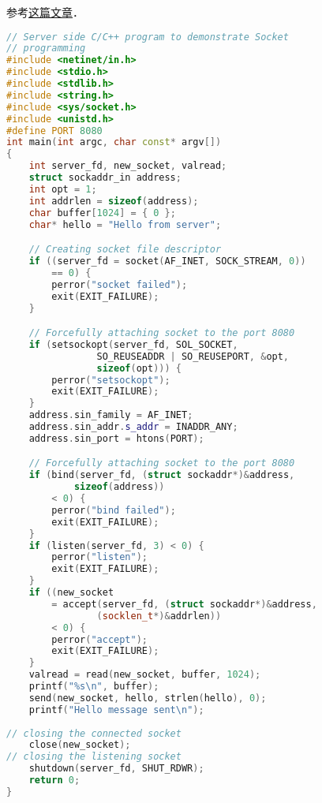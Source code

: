 
\begin{issues}
\issueDraft
\end{issues}

参考\href{https://www.geeksforgeeks.org/socket-programming-cc/}{这篇文章}．

\begin{lstlisting}[language=cpp, caption=server.cpp]
// Server side C/C++ program to demonstrate Socket
// programming
#include <netinet/in.h>
#include <stdio.h>
#include <stdlib.h>
#include <string.h>
#include <sys/socket.h>
#include <unistd.h>
#define PORT 8080
int main(int argc, char const* argv[])
{
	int server_fd, new_socket, valread;
	struct sockaddr_in address;
	int opt = 1;
	int addrlen = sizeof(address);
	char buffer[1024] = { 0 };
	char* hello = "Hello from server";

	// Creating socket file descriptor
	if ((server_fd = socket(AF_INET, SOCK_STREAM, 0))
		== 0) {
		perror("socket failed");
		exit(EXIT_FAILURE);
	}

	// Forcefully attaching socket to the port 8080
	if (setsockopt(server_fd, SOL_SOCKET,
				SO_REUSEADDR | SO_REUSEPORT, &opt,
				sizeof(opt))) {
		perror("setsockopt");
		exit(EXIT_FAILURE);
	}
	address.sin_family = AF_INET;
	address.sin_addr.s_addr = INADDR_ANY;
	address.sin_port = htons(PORT);

	// Forcefully attaching socket to the port 8080
	if (bind(server_fd, (struct sockaddr*)&address,
			sizeof(address))
		< 0) {
		perror("bind failed");
		exit(EXIT_FAILURE);
	}
	if (listen(server_fd, 3) < 0) {
		perror("listen");
		exit(EXIT_FAILURE);
	}
	if ((new_socket
		= accept(server_fd, (struct sockaddr*)&address,
				(socklen_t*)&addrlen))
		< 0) {
		perror("accept");
		exit(EXIT_FAILURE);
	}
	valread = read(new_socket, buffer, 1024);
	printf("%s\n", buffer);
	send(new_socket, hello, strlen(hello), 0);
	printf("Hello message sent\n");
	
// closing the connected socket
	close(new_socket);
// closing the listening socket
	shutdown(server_fd, SHUT_RDWR);
	return 0;
}
\end{lstlisting}

